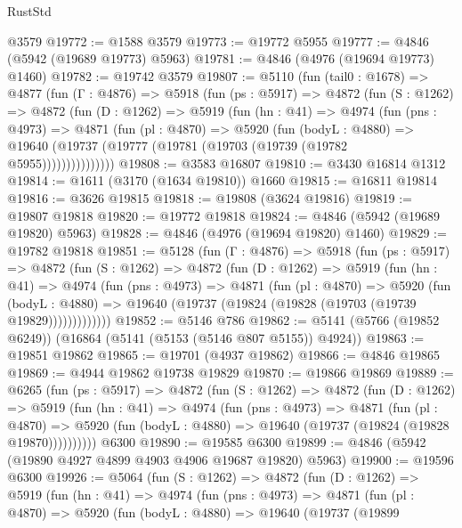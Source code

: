 \begin{lexlean}{RustStd}
\begin{coremodule}
    @3579
@19772 := @1588 @3579
@19773 := @19772 @5955
@19777 := @4846 (@5942 (@19689 @19773) @5963)
@19781 := @4846 (@4976 (@19694 @19773) @1460)
@19782 := @19742 @3579
@19807 := @5110
    (fun (tail0 : @1678) =>
    @4877
      (fun (Γ : @4876) =>
      @5918
        (fun (ps : @5917) =>
        @4872
          (fun (S : @1262) =>
          @4872
            (fun (D : @1262) =>
            @5919
              (fun (hn : @41) =>
              @4974
                (fun (pns : @4973) =>
                @4871
                  (fun (pl : @4870) =>
                  @5920
                    (fun (bodyL : @4880) =>
                    @19640 (@19737 (@19777 (@19781 (@19703 (@19739 (@19782 @5955)))))))))))))))
@19808 := @3583 @16807
@19810 := @3430 @16814 @1312
@19814 := @1611 (@3170 (@1634 @19810)) @1660
@19815 := @16811 @19814
@19816 := @3626 @19815
@19818 := @19808 (@3624 @19816)
@19819 := @19807 @19818
@19820 := @19772 @19818
@19824 := @4846 (@5942 (@19689 @19820) @5963)
@19828 := @4846 (@4976 (@19694 @19820) @1460)
@19829 := @19782 @19818
@19851 := @5128
    (fun (Γ : @4876) =>
    @5918
      (fun (ps : @5917) =>
      @4872
        (fun (S : @1262) =>
        @4872
          (fun (D : @1262) =>
          @5919
            (fun (hn : @41) =>
            @4974
              (fun (pns : @4973) =>
              @4871
                (fun (pl : @4870) =>
                @5920
                  (fun (bodyL : @4880) =>
                  @19640 (@19737 (@19824 (@19828 (@19703 (@19739 @19829)))))))))))))
@19852 := @5146 @786
@19862 := @5141 (@5766 (@19852 @6249)) (@16864 (@5141 (@5153 (@5146 @807 @5155)) @4924))
@19863 := @19851 @19862
@19865 := @19701 (@4937 @19862)
@19866 := @4846 @19865
@19869 := @4944 @19862 @19738 @19829
@19870 := @19866 @19869
@19889 := @6265
    (fun (ps : @5917) =>
    @4872
      (fun (S : @1262) =>
      @4872
        (fun (D : @1262) =>
        @5919
          (fun (hn : @41) =>
          @4974
            (fun (pns : @4973) =>
            @4871
              (fun (pl : @4870) =>
              @5920 (fun (bodyL : @4880) => @19640 (@19737 (@19824 (@19828 @19870))))))))))
    @6300
@19890 := @19585 @6300
@19899 := @4846 (@5942 (@19890 @4927 @4899 @4903 @4906 @19687 @19820) @5963)
@19900 := @19596 @6300
@19926 := @5064
    (fun (S : @1262) =>
    @4872
      (fun (D : @1262) =>
      @5919
        (fun (hn : @41) =>
        @4974
          (fun (pns : @4973) =>
          @4871
            (fun (pl : @4870) =>
            @5920
              (fun (bodyL : @4880) =>
              @19640
                (@19737
                  (@19899

\end{coremodule}
\end{lexlean}
